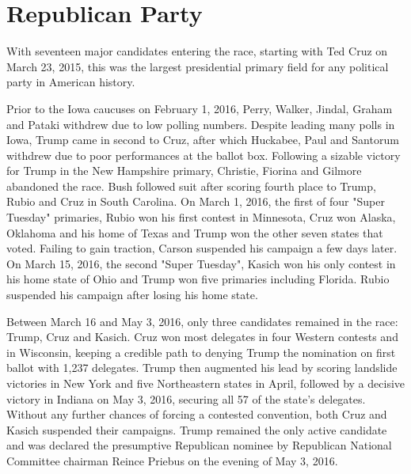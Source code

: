 \section{Republican Party}

With seventeen major candidates entering the race, starting with Ted Cruz on March 23, 2015, this was the largest presidential primary field for any political party in American history.

Prior to the Iowa caucuses on February 1, 2016, Perry, Walker, Jindal, Graham and Pataki withdrew due to low polling numbers. Despite leading many polls in Iowa, Trump came in second to Cruz, after which Huckabee, Paul and Santorum withdrew due to poor performances at the ballot box. Following a sizable victory for Trump in the New Hampshire primary, Christie, Fiorina and Gilmore abandoned the race. Bush followed suit after scoring fourth place to Trump, Rubio and Cruz in South Carolina. On March 1, 2016, the first of four "Super Tuesday" primaries, Rubio won his first contest in Minnesota, Cruz won Alaska, Oklahoma and his home of Texas and Trump won the other seven states that voted. Failing to gain traction, Carson suspended his campaign a few days later. On March 15, 2016, the second "Super Tuesday", Kasich won his only contest in his home state of Ohio and Trump won five primaries including Florida. Rubio suspended his campaign after losing his home state.

Between March 16 and May 3, 2016, only three candidates remained in the race: Trump, Cruz and Kasich. Cruz won most delegates in four Western contests and in Wisconsin, keeping a credible path to denying Trump the nomination on first ballot with 1,237 delegates. Trump then augmented his lead by scoring landslide victories in New York and five Northeastern states in April, followed by a decisive victory in Indiana on May 3, 2016, securing all 57 of the state's delegates. Without any further chances of forcing a contested convention, both Cruz and Kasich suspended their campaigns. Trump remained the only active candidate and was declared the presumptive Republican nominee by Republican National Committee chairman Reince Priebus on the evening of May 3, 2016.

